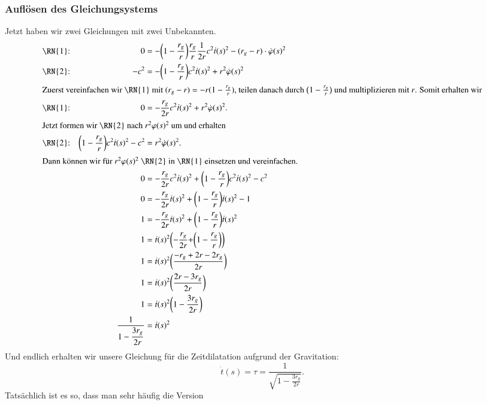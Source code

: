 \begin{refsection}
\subsubsection{Auflösen des Gleichungsystems}
Jetzt haben wir zwei Gleichungen mit zwei Unbekannten.
\begin{align*}
\text{\RN{1}:}
&&
0
&=
-\biggl(1-\frac{r_g}{r}\biggr)\frac{r_g}{r}\frac1{2r}c^2\dot t(s)^2 - (r_g-r)\cdot \dot \varphi(s)^2
\\
\text{\RN{2}:}
&&
-c^2
&=
-\biggl(1-\frac{r_g}r\biggr)c^2 \dot t(s)^2 + r^2 \dot \varphi (s)^2
\\
\intertext{%
Zuerst vereinfachen wir \RN{1} mit $ (r_g - r) = -r (1 - \frac{r_g}{r} )$,
teilen danach durch $\bigl( 1 - \frac{r_g}{r} \bigr)$ und multiplizieren
mit $r$. Somit erhalten wir}
\text{\RN{1}:}
&&
0
&=
-\frac{r_g}{2r} c^2 \dot t(s)^2 + r^2 \dot \varphi(s)^2.
\\
\intertext{%
Jetzt formen wir \RN{2} nach $ r^2 \varphi(s)^2$ um und erhalten}
\text{\RN{2}:}
&&
\biggl( 1 - \frac{r_g}{r} \biggr) c^2 \dot t(s)^2 - c^2
&=
r^2 \dot \varphi (s)^2.
\\
\intertext{%
Dann können wir für $ r^2 \varphi(s)^2$ \RN{2} in \RN{1} einsetzen
und vereinfachen.}
&&0 &= -\frac{r_g}{2r} c^2 \dot t(s)^2 + \biggl( 1 - \frac{r_g}{r} \biggr) c^2 \dot t(s)^2 - c^2  
\\
&&0 &= -\frac{r_g}{2r}\dot t(s)^2 + \biggl( 1 - \frac{r_g}{r} \biggr) \dot t(s)^2 - 1 
\\
&&1 &= -\frac{r_g}{2r}\dot t(s)^2 + \biggl( 1 - \frac{r_g}{r} \biggr) \dot t(s)^2
\\
&&1 &= \dot t(s)^2 \biggl( -\frac{r_g}{2r} + \biggr( 1 - \frac{r_g}{r} \biggr) \biggr) 
\\
&&1 &= \dot t(s)^2 \biggl( \frac{-r_g + 2r - 2r_g}{2r}\biggr)
\\
&&1 &= \dot t(s)^2 \biggl( \frac{2r-3r_g}{2r}\biggr)
\\
&&1 &= \dot t(s)^2 \biggl( 1 - \frac{3r_g}{2r}\biggr) 
\\
&&\frac{1}{\displaystyle 1 - \frac{3r_g}{2r} } &= \dot t(s)^2 
\end{align*}
Und endlich erhalten wir unsere Gleichung für die Zeitdilatation aufgrund der Gravitation:
\begin{equation}
\label{gps:equation:gravidilatationmitbewegung}
\dot t(s) = \tau = \frac{1}{ \sqrt{\displaystyle 1 - \frac{3r_g}{2r}} }.
\end{equation}
Tatsächlich ist es so, dass man sehr häufig die Version
\begin{equation}

\end{equation}
\end{refsection}
